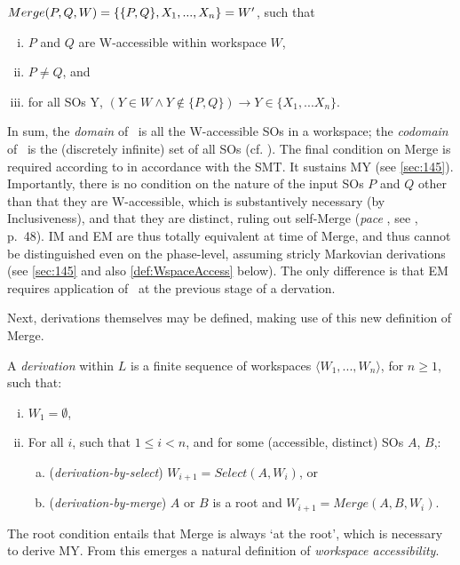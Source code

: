 \begin{definition}\label{def:merge}
    $Merge(P, Q, W)=\{\{P, Q\}, X_1, ..., X_n\}=W'$, such that
    \begin{enumerate}[(i)]
        \item $P$ and $Q$ are W-accessible within workspace $W$,
        \item $P \neq Q$, and
        \item for all SOs Y, $(Y \in W \wedge Y \notin \{P, Q\}) \rightarrow Y \in \{X_1, ... X_n\}$.
    \end{enumerate}
\end{definition}
\noindent
In sum, the \textit{domain} of \MERGE\ is all the W-accessible SOs in a workspace; the \textit{codomain} of \MERGE\ is the (discretely infinite) set of all SOs (cf. ). The final condition on Merge is required according to \textcite{ChomskyN_2021} in accordance with the SMT. It sustains MY (see \autoref{sec:145}). Importantly, there is no condition on the nature of the input SOs $P$ and $Q$ other than that they are W-accessible, which is substantively necessary (by Inclusiveness), and that they are distinct, ruling out self-Merge (\textit{pace} , see \CS, p.~48). IM and EM are thus totally equivalent at time of Merge, and thus cannot be distinguished even on the phase-level, assuming stricly Markovian derivations (see \autoref{sec:145} and also \autoref{def:WspaceAccess} below). The only difference is that EM requires application of \Select\ at the previous stage of a dervation.

Next, derivations themselves may be defined, making use of this new definition of Merge.

\begin{definition}\label{def:derivation:1}
    A \textit{derivation} within $L$ is a finite sequence of workspaces $\langle W_1, ..., W_n \rangle$, for $n \geq 1$, such that:
    \begin{enumerate}[(i)]
        \item $W_1 = \emptyset$,
        \item For all $i$, such that $1 \leq i < n$, and for some (accessible, distinct) SOs $A$, $B$,:
        \begin{enumerate}[(a)]
            \item (\textit{derivation-by-select}) $W_{i+1}=Select(A, W_i)$, or
            \item (\textit{derivation-by-merge}) $A$ or $B$ is a root and $W_{i+1}=Merge(A, B, W_i)$.
        \end{enumerate}
    \end{enumerate}
\end{definition}
\noindent
The root condition entails that Merge is always `at the root', which is necessary to derive MY. From this emerges a natural definition of \textit{workspace accessibility}.

